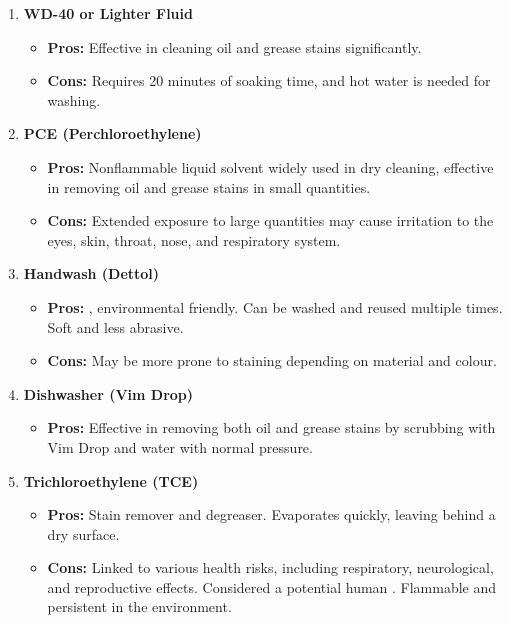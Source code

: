 \documentclass[table,french,english]{rapportCS}
\begin{document}
\begin{enumerate}
    \item \textbf{WD-40 or Lighter Fluid}
    \begin{itemize}[label=$\bullet$]
        \item \textbf{Pros:} Effective in cleaning oil and grease stains significantly.
        \item \textbf{Cons:} Requires 20 minutes of soaking time, and hot water is needed for washing.
    \end{itemize}

    \item \textbf{PCE (Perchloroethylene)}
    \begin{itemize}[label=$\bullet$]
        \item \textbf{Pros:} Nonflammable liquid solvent widely used in dry cleaning, effective in removing oil and grease stains in small quantities.
        \item \textbf{Cons:} Extended exposure to large quantities may cause irritation to the eyes, skin, throat, nose, and respiratory system.
    \end{itemize}
\newpage
    \item \textbf{Handwash (Dettol)}
    \begin{itemize}[label=$\bullet$]
        \item \textbf{Pros:} , environmental friendly. Can be washed and reused multiple times. Soft and less abrasive.
        \item \textbf{Cons:} May be more prone to staining depending on material and colour.
    \end{itemize}

    \item \textbf{Dishwasher (Vim Drop)}
    \begin{itemize}[label=$\bullet$]
        \item \textbf{Pros:} Effective in removing both oil and grease stains by scrubbing with Vim Drop and water with normal pressure.
    \end{itemize}

    \item \textbf{Trichloroethylene (TCE)}
    \begin{itemize}[label=$\bullet$]
        \item \textbf{Pros:} Stain remover and degreaser. Evaporates quickly, leaving behind a dry surface.
        \item \textbf{Cons:} Linked to various health risks, including respiratory, neurological, and reproductive effects. Considered a potential human  . Flammable and persistent in the environment.
    \end{itemize}


\end{enumerate}
\end{document}
